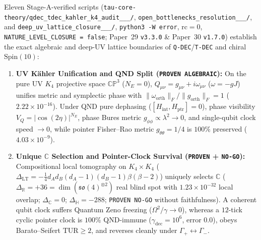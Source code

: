 \documentclass[11pt,a4paper]{article}
\begin{document}
Eleven Stage-A-verified scripts (\texttt{tau-core-theory/\allowbreak qdec\_\allowbreak tdec\_\allowbreak kahler\_\allowbreak k4\_\allowbreak audit\_\_\_/}, \texttt{open\_\allowbreak bottlenecks\_\allowbreak resolution\_\_\_/}, and \texttt{deep\_\allowbreak uv\_\allowbreak lattice\_\allowbreak closure\_\_\_/}, \texttt{python3 -W error}, $\mathrm{rc}=0$, \texttt{NATURE\_\allowbreak LEVEL\_\allowbreak CLOSURE = false}; Paper~29 \texttt{v3.3.0} \& Paper~30 \texttt{v1.7.0}) establish the exact algebraic and deep-UV lattice boundaries of \texttt{Q-DEC}/\texttt{T-DEC} and chiral $\mathrm{Spin}(10)$:
\begin{enumerate}\setlength{\itemsep}{2pt}
\item \textbf{UV K\"ahler Unification and QND Split (\texttt{PROVEN ALGEBRAIC}):} On the pure UV $K_4$ projective space $\mathbb{CP}^3$ ($N_E=0$), $Q_{\mu\nu}=g_{\mu\nu}+i\omega_{\mu\nu}$ ($\omega=-gJ$) unifies metric and symplectic phase with $\|\omega_{\mathrm{orth}}\|_F/\|g_{\mathrm{orth}}\|_F=1$ ($2.22\times 10^{-16}$). Under QND pure dephasing ($[H_{\mathrm{int}},H_{\mathrm{ptr}}]=0$), phase visibility $V_Q=|\cos(2\eta)|^{N_E}$, phase Bures metric $g_{\phi\phi}\propto\lambda^2\to 0$, and single-qubit clock speed $\to 0$, while pointer Fisher--Rao metric $g_{\theta\theta}=1/4$ is $100\%$ preserved ($4.03\times 10^{-9}$).
\item \textbf{Unique $\mathbb{C}$ Selection and Pointer-Clock Survival (\texttt{PROVEN} + \texttt{NO-GO}):} Compositional local tomography on $K_4\times K_4$ ($\Delta_{\mathrm{LT}}=-\frac{1}{4}d_A d_B(d_A-1)(d_B-1)\beta(\beta-2)$) uniquely selects $\mathbb{C}$ ($\Delta_{\mathbb{R}}=+36=\dim(\mathfrak{so}(4)^{\otimes 2})$ real blind spot with $1.23\times 10^{-32}$ local overlap; $\Delta_{\mathbb{C}}=0$; $\Delta_{\mathbb{H}}=-288$; \texttt{PROVEN NO-GO} without faithfulness). A coherent qubit clock suffers Quantum Zeno freezing ($\Omega^2/\gamma\to 0$), whereas a $12$-tick cyclic pointer clock is $100\%$ QND-immune ($\gamma_{\mathrm{dec}}=10^6$, error $0.0$), obeys Barato--Seifert $\mathrm{TUR}\ge 2$, and reverses cleanly under $\Gamma_+\leftrightarrow\Gamma_-$.

\end{enumerate}
\end{document}
